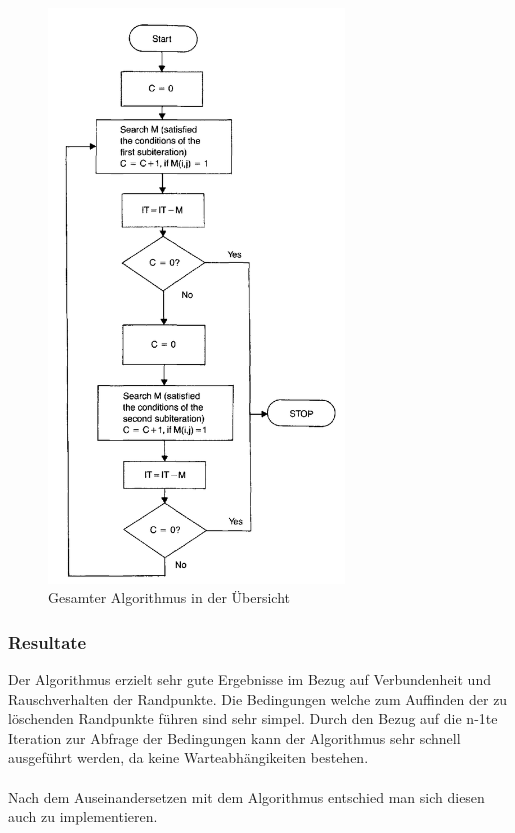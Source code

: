 \begin{figure}
\centering
\includegraphics[width=0.7\textwidth]{./Res/AlgUebersicht}
\caption{Gesamter Algorithmus in der Übersicht}
\label{fig:AlgUebersicht}
\end{figure}
\FloatBarrier
\subsubsection{Resultate}

Der Algorithmus erzielt sehr gute Ergebnisse im Bezug auf Verbundenheit und Rauschverhalten der Randpunkte. Die Bedingungen welche zum Auffinden der zu löschenden Randpunkte führen sind sehr simpel. Durch den Bezug auf die n-1te Iteration zur Abfrage der Bedingungen kann der Algorithmus sehr schnell ausgeführt werden, da keine Warteabhängikeiten bestehen. \\ \\
Nach dem Auseinandersetzen mit dem Algorithmus entschied man sich diesen auch zu implementieren.

